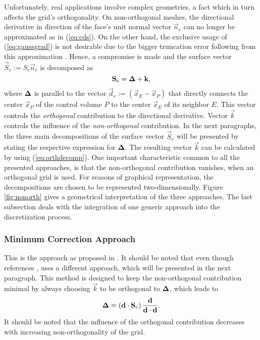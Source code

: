 Unfortunately, real applications involve complex geometries, a fact which in turn affects the grid's orthogonality. On non-orthogonal meshes, the directional derivative in direction of the face's unit normal vector \(\vec{n}_e\) can no longer be approximated as in (\ref{eq:cds}). On the other hand, the exclusive usage of (\ref{eq:gaussgrad}) is not desirable due to the bigger truncation error following from this approximation \cite{jasak96}. Hence, a compromise is made and the surface vector \(\vec{S}_e := S_e \vec{n}_e\) is decomposed as
\begin{equation}
  \label{eq:orthdecomp}
  \mathbf{S}_e = \boldsymbol{\Delta} + \mathbf{k},
\end{equation}
where \(\boldsymbol{\Delta}\) is parallel to the vector \(\vec{d}_e := \left(\vec{x}_E - \vec{x}_P\right)\) that directly connects the center \(\vec{x}_P\) of the control volume \(P\) to the center \(\vec{x}_E\) of its neighbor \(E\). This vector controls the \emph{orthogonal} contribution to the directional derivative. Vector \(\vec{k}\) controls the influence of the \emph{non-orthogonal} contribution. In the next paragraphs, the three main decompositions of the surface vector \(\vec{S}_e\) will be presented by stating the respective expression for \(\boldsymbol{\Delta}\). The resulting vector \(\vec{k}\) can be calculated by using (\ref{eq:orthdecomp}). One important characteristic common to all the presented approaches, is that the non-orthogonal contribution vanishes, when an orthogonal grid is used. For reasons of graphical representation, the decompositions are chosen to be represented two-dimensionally. Figure \ref{fig:nonorth} gives a geometrical interpretation of the three approaches. The last subsection deals with the integration of one generic approach into the discretization process.

\subsubsection{Minimum Correction Approach}

This is the approach as proposed in \cite{muzaferja}. It should be noted that even though \cite{ferziger02} references \cite{muzaferja}, \cite{ferziger02} uses a different approach, which will be presented in the next paragraph. This method is designed to keep the non-orthogonal contribution minimal by always choosing \(\vec{k}\) to be orthogonal to \(\boldsymbol{\Delta}\), which leads to
\begin{displaymath}
  \boldsymbol{\Delta} = \left( \mathbf{d} \cdot \mathbf{S}_e \right) \frac{\mathbf{d}}{\mathbf{d} \cdot \mathbf{d}}.
\end{displaymath}
It should be noted that the influence of the orthogonal contribution decreases with increasing non-orthogonality of the grid.

